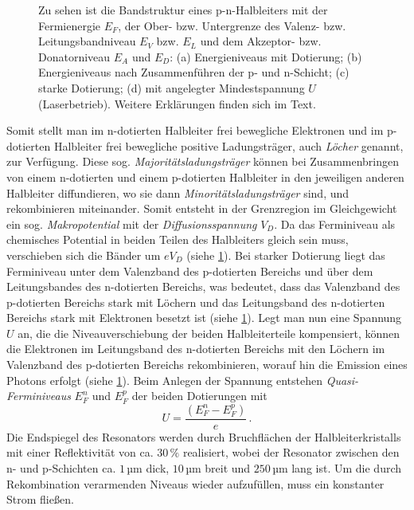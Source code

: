 \begin{figure}[h]
{{{	  	}
	}}
	\caption[Bandstruktur Halbleiterlaser]{Zu sehen ist die Bandstruktur eines
	p-n-Halbleiters mit der Fermienergie $E_F$, der Ober- bzw. Untergrenze des Valenz- bzw.
	Leitungsbandniveau $E_V$ bzw. $E_L$ und dem Akzeptor- bzw. Donatorniveau $E_A$
	und $E_D$:
	(a) Energieniveaus mit Dotierung; (b) Energieniveaus nach
	Zusammenführen der p- und n-Schicht; (c) starke
	Dotierung; (d) mit angelegter Mindestspannung $U$
	(Laserbetrieb). Weitere Erklärungen finden sich im
	Text.}\label{fig:pn-halbleiter}
\end{figure}
Somit stellt
man im n-dotierten Halbleiter frei bewegliche Elektronen und im p-dotierten Halbleiter frei bewegliche positive
Ladungsträger, auch \textit{Löcher} genannt, zur Verfügung. Diese sog.
\textit{Majoritätsladungsträger} können bei Zusammenbringen von einem
n-dotierten und einem p-dotierten Halbleiter in den jeweiligen anderen
Halbleiter diffundieren, wo sie dann \textit{Minoritätsladungsträger} sind, und
rekombinieren miteinander. Somit entsteht in der Grenzregion im Gleichgewicht
ein sog. \textit{Makropotential} mit der \textit{Diffusionsspannung} $V_D$. Da
das Ferminiveau als chemisches Potential in beiden Teilen des Halbleiters gleich
sein muss, verschieben sich die Bänder um $eV_D$ (siehe
\ref{fig:pn-halbleiter}). Bei starker Dotierung
liegt das Ferminiveau unter dem Valenzband des p-dotierten Bereichs und über dem Leitungsbandes des
n-dotierten Bereichs, was bedeutet, dass das Valenzband des p-dotierten Bereichs
stark mit Löchern und das Leitungsband des n-dotierten Bereichs stark mit
Elektronen besetzt ist (siehe
\ref{fig:pn-halbleiter}). Legt man nun eine Spannung $U$ an, die die Niveauverschiebung der beiden Halbleiterteile
kompensiert, können die Elektronen im Leitungsband des n-dotierten Bereichs mit
den Löchern im Valenzband des p-dotierten Bereichs rekombinieren, worauf hin
die Emission eines Photons erfolgt (siehe
\ref{fig:pn-halbleiter}). Beim Anlegen der
Spannung entstehen \textit{Quasi-Ferminiveaus} $E_F^n$ und $E_F^p$ der beiden Dotierungen mit
\begin{equation}\label{eq:quasi-ferminiveaus}
	U=\frac{\left(E_F^n-E_F^p\right)}{e}\,.
\end{equation}
Die Endspiegel des Resonators werden durch Bruchflächen der Halbleiterkristalls
mit einer Reflektivität von ca. $30\,\%$ realisiert, wobei der Resonator
zwischen den n- und p-Schichten ca. $1\,$µm dick, $10\,$µm breit und $250\,$µm
lang ist. Um die durch Rekombination verarmenden Niveaus wieder aufzufüllen,
muss ein konstanter Strom fließen.

